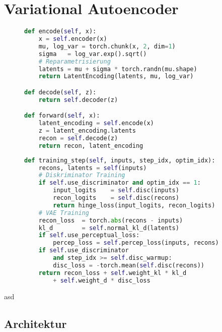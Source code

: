 \section {Variational Autoencoder}

\begin{figure}[htbp]
\begin{lstlisting}[language=python]
def encode(self, x):
    x = self.encoder(x)
    mu, log_var = torch.chunk(x, 2, dim=1) 
    sigma   = log_var.exp().sqrt()
    # Reparametrisierung
    latents = mu + sigma * torch.randn(mu.shape)
    return LatentEncoding(latents, mu, log_var)

def decode(self, z):
    return self.decoder(z)

def forward(self, x):
    latent_encoding = self.encode(x) 
    z = latent_encoding.latents
    recon = self.decode(z)
    return recon, latent_encoding
\end{lstlisting}
    \captionsetup{type=figure}
    \label{fig:vae_forward}
\end{figure}

\begin{figure}[htbp]
\begin{lstlisting}[language=python]
def training_step(self, inputs, step_idx, optim_idx):
    recons, latents = self(inputs)
    # Diskriminator Training 
    if self.use_discriminator and optim_idx == 1:
        input_logits    = self.disc(inputs)
        recon_logits    = self.disc(recons)
        return hinge_loss(input_logits, recon_logits)
    # VAE Training
    recon_loss  = torch.abs(recons - inputs)
    kl_d        = self.normal_kl_d(latents)      
    if self.use_perceptual_loss:   
        percep_loss = self.percep_loss(inputs, recons)
    if self.use_discriminator 
        and step_idx >= self.disc_warmup:    
        disc_loss = -torch.mean(self.disc(recons))
    return recon_loss + self.weight_kl * kl_d 
        + self.weight_d * disc_loss 
\end{lstlisting}
    \captionsetup{type=figure}
    \label{fig:vae_training}
\end{figure}


asd

\subsection{Architektur}

